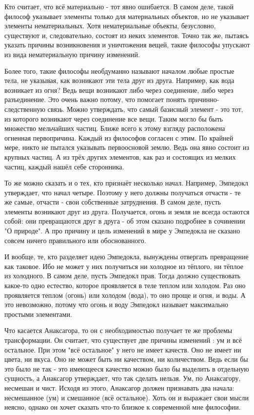 \documentclass{article}
\begin{document}
Кто считает, что всё материально - тот явно ошибается. В самом деле, такой философ указывает элементы только для материальных объектов, но не указывает элементы нематериальных. Хотя нематериальные объекты, безусловно, существуют и, следовательно, состоят из неких элементов. Точно так же, пытаясь указать причины возникновения и уничтожения вещей, такие философы упускают из вида нематериальную причину изменений.

Более того, такие философы необдуманно называют началом любые простые тела, не указывая, как возникают эти тела друг из друга. Например, как вода возникает из огня? Ведь вещи возникают либо через соединение, либо через разъединение. Это очень важно потому, что помогает понять причинно-следственную связь. Можно утверждать, что самый базисный элемент - это тот, из которого возникают через соединение все вещи.
\footnotemark[1]
Таким могло бы быть множество мельчайших частиц. Ближе всего к этому взгляду расположена огненная первопричина. Каждый из философов согласен с этим. По крайней мере, никто не пытался указывать первоосновой землю. Ведь она явно состоит из крупных частиц. А из трёх других элементов, как раз и состоящих из мелких частиц, каждый нашёл себе сторонника.

То же можно сказать и о тех, кто признаёт несколько начал. Например, Эмпедокл утверждает, что начал четыре.
\footnotemark[2]
Поэтому у него должны получаться отчасти - те же самые, отчасти - свои собственные затруднения. В самом деле, пусть элементы возникают друг из друга. Получается, огонь и земля не всегда остаются собой: они превращаются друг в друга - об этом сказано подробнее в сочинении "О природе". А про причину и цель изменений в мире у Эмпедокла не сказано совсем ничего правильного или обоснованного.

И вообще, те, кто разделяет идею Эмпедокла, вынуждены отвергать превращение как таковое. Ибо не может у них получиться ни холодное из тёплого, ни тёплое из холодного. В самом деле, пусть Эмпедокл прав. Тогда должно существовать какое-то одно естество, которое проявляется в теле теплом или холодом. Раз оно проявляется теплом (огонь) или холодом (вода), то оно проще и огня, и воды. А это невозможно, потому что огонь и воду Эмпедокл называет максимально простыми элементами.

Что касается Анаксагора, то он с необходимостью получает те же проблемы трансформации. Он считает, что существует две причины изменений
\footnotemark[3]
: ум и всё остальное. При этом "всё остальное" у него не имеет качеств. Оно не имеет ни цвета, ни вкуса. Оно не может быть ни качеством, ни количеством. Ведь если бы это было не так - это имеющееся качество можно было бы выделить в отдельную сущность, а Анаксагор утверждает, что так сделать нельзя. Ум, по Анаксагору, несмешан и чист. Исходя из этого, Анаксагор должен признавать два начала: несмешанное (ум) и смешанное (всё остальное). Хоть он и выражает свои мысли неясно, однако он хочет сказать что-то близкое к современной мне философии.
\end{document}
